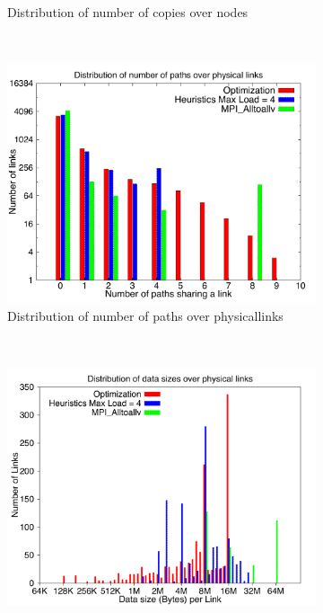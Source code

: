\begin{figure}[!htbp]
\begin{subfigure}[b]{0.49\textwidth}
                \caption{Distribution of number of copies over nodes}
                \label{fig:3_512_copy}
        \end{subfigure}
        ~ %
        \begin{subfigure}[b]{0.49\textwidth}
                \includegraphics[width=\textwidth]{report_figures/constantr/3_512/loadpath_histo.pdf}
                \caption{Distribution of number of paths over physicallinks}
                \label{fig:3_512_loadpath}
        \end{subfigure}
        ~ %
        \begin{subfigure}[b]{0.49\textwidth}
                \includegraphics[width=\textwidth]{report_figures/constantr/3_512/loaddata_histo.pdf}

\end{subfigure}
\end{figure}
